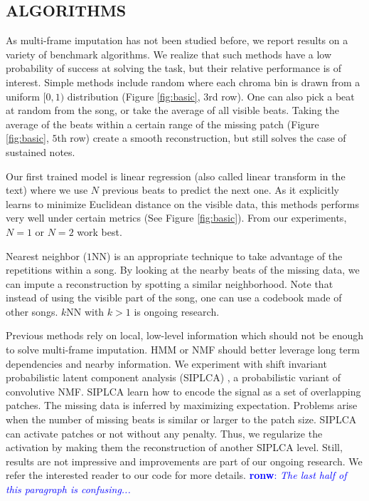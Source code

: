 \documentclass{article}
\newcommand{\FIXME}[2][FIXME]{\textcolor{blue}{\textbf{#1}: \emph{#2}}}
\begin{document}
\subsection{ALGORITHMS}
\label{ssec:algo}
As multi-frame imputation has not been studied before, we report
results on a variety of benchmark algorithms. We realize that such
methods have a low probability of success at solving the task, but
their relative performance is of interest.  Simple methods include
random where each chroma bin is drawn from a uniform $[0,1)$
distribution (Figure \ref{fig:basic}, $3$rd row).  One can also pick a
beat at random from the song, or take the average of all visible
beats. Taking the average of the beats within a certain range
of the missing patch (Figure \ref{fig:basic}, $5$th row) create a
smooth reconstruction, but still solves the case of sustained notes.

Our first trained model is linear regression (also called linear
transform in the text) where we use $N$ previous beats to predict the
next one.  As it explicitly learns to minimize Euclidean distance on
the visible data, this methods performs very well under certain
metrics (See Figure \ref{fig:basic}). From our experiments, $N=1$ or
$N=2$ work best.

Nearest neighbor ($1$NN) is an appropriate technique
to take advantage of the repetitions within a song. By looking at the
nearby beats of the missing data, we can impute a reconstruction by
spotting a similar neighborhood. Note that instead of using the
visible part of the song, one can use a codebook made of
other songs.  $k$NN with $k>1$ is ongoing research.

Previous methods rely on local, low-level information which should not
be enough to solve multi-frame imputation. HMM or NMF should better
leverage long term dependencies and nearby information.  We experiment
with shift invariant probabilistic latent component analysis
(SIPLCA) \cite{Smaragdis2009,Weiss2010}, a probabilistic
variant of convolutive NMF. SIPLCA learn how to encode the signal as a
set of overlapping patches. The missing data is inferred by maximizing
expectation.  Problems arise when the number of missing beats is
similar or larger to the patch size. SIPLCA can activate patches or
not without any penalty. Thus, we regularize the activation by making
them the reconstruction of another SIPLCA level.  Still, results are
not impressive and improvements are part of our ongoing research. We
refer the interested reader to our code for more details.
\FIXME[ronw]{The last half of this paragraph is confusing...}
\end{document}
